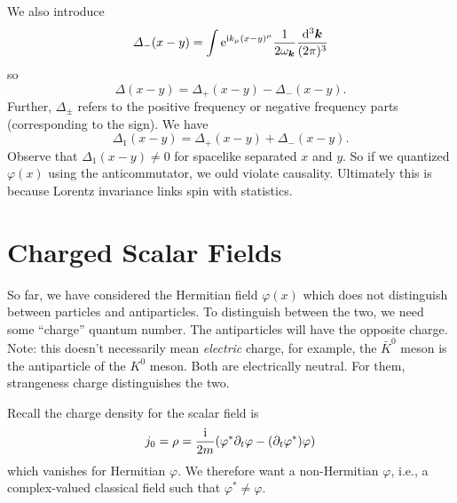 We also introduce
\begin{equation}
\Delta_{-}(x-y)=\int\E^{\I k_{\mu}(x-y)^{\mu}}\frac{1}{2\omega_{\vec{k}}}\frac{\D^{3}\vec{k}}{(2\pi)^{3}}
\end{equation}
so
\begin{equation}
\Delta(x-y) = \Delta_{+}(x-y)-\Delta_{-}(x-y).
\end{equation}
Further, $\Delta_{\pm}$ refers to the positive frequency or negative
frequency parts (corresponding to the sign). We have
\begin{equation}
\Delta_{1}(x-y)=\Delta_{+}(x-y)+\Delta_{-}(x-y).
\end{equation}
Observe that $\Delta_{1}(x-y)\neq0$ for spacelike separated $x$ and
$y$. So if we quantized $\varphi(x)$ using the anticommutator, we ould
violate causality. Ultimately this is because Lorentz invariance links
spin with statistics.

\section{Charged Scalar Fields}

So far, we have considered the Hermitian field $\varphi(x)$ which does
not distinguish between particles and antiparticles. To distinguish
between the two, we need some ``charge'' quantum number. The
antiparticles will have the opposite charge. Note: this doesn't
necessarily mean \emph{electric} charge, for example, the $\bar{K}^{0}$
meson is the antiparticle of the $K^{0}$ meson. Both are electrically
neutral. For them, strangeness charge distinguishes the two.

Recall  the charge density for the scalar
field is
\begin{equation}
j_{0} = \rho
= \frac{\mathrm{i}}{2m}(\varphi^{*}\partial_{t}\varphi-(\partial_{t}\varphi^{*})\varphi)
\end{equation}
which vanishes for Hermitian $\varphi$.  We therefore want a
non-Hermitian $\varphi$, i.e., a complex-valued classical field such
that $\varphi^{*}\neq\varphi$.

